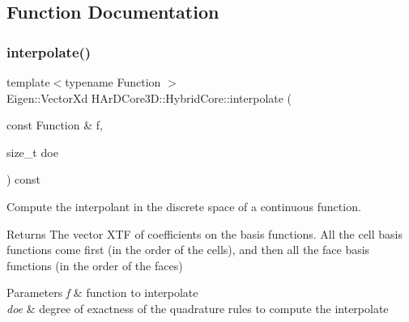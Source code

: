 \subsection{Function Documentation}
\mbox{\label{group__HybridCore_gaa1c3baf0764f3f160759e0ffc8969dfb}} 
\subsubsection{\texorpdfstring{interpolate()}{interpolate()}}
{\footnotesize\ttfamily template$<$typename Function $>$ \\
Eigen\+::\+Vector\+Xd H\+Ar\+D\+Core3\+D\+::\+Hybrid\+Core\+::interpolate (\begin{DoxyParamCaption}\item[{const Function \&}]{f,  }\item[{size\+\_\+t}]{doe }\end{DoxyParamCaption}) const}



Compute the interpolant in the discrete space of a continuous function. 

\begin{DoxyReturn}{Returns}
The vector X\+TF of coefficients on the basis functions. All the cell basis functions come first (in the order of the cells), and then all the face basis functions (in the order of the faces) 
\end{DoxyReturn}

\begin{DoxyParams}{Parameters}
{\em f} & function to interpolate \\
\hline
{\em doe} & degree of exactness of the quadrature rules to compute the interpolate \\
\hline
\end{DoxyParams}
